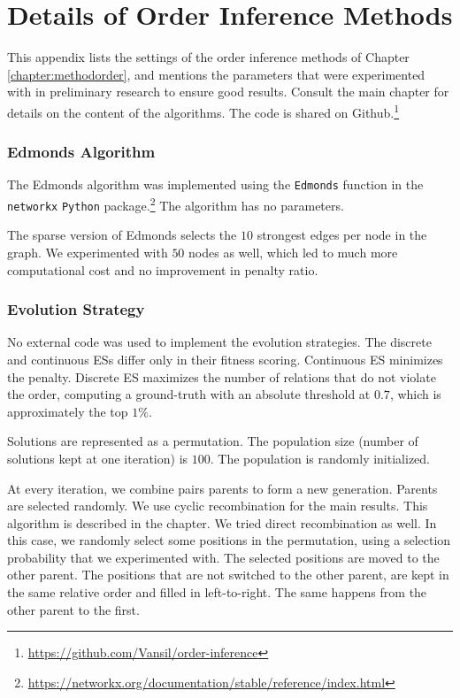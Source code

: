 \newpage
\section{Details of Order Inference Methods}
\label{appendix:order}

This appendix lists the settings of the order inference methods of Chapter \ref{chapter:methodorder}, and mentions the parameters that were experimented with in preliminary research to ensure good results. Consult the main chapter for details on the content of the algorithms. The code is shared on Github.\footnote{\href{https://github.com/Vansil/order-inference}{https://github.com/Vansil/order-inference}}

\subsubsection{Edmonds Algorithm}

The Edmonds algorithm was implemented using the \texttt{Edmonds} function in the \texttt{networkx} \texttt{Python} package.\footnote{\href{https://networkx.org/documentation/stable/reference/index.html}{https://networkx.org/documentation/stable/reference/index.html}} The algorithm has no parameters.

The sparse version of Edmonds selects the $10$ strongest edges per node in the graph. We experimented with $50$ nodes as well, which led to much more computational cost and no improvement in penalty ratio.


\subsubsection{Evolution Strategy}

No external code was used to implement the evolution strategies. The discrete and continuous ESs differ only in their fitness scoring. Continuous ES minimizes the penalty. Discrete ES maximizes the number of relations that do not violate the order, computing a ground-truth with an absolute threshold at $0.7$, which is approximately the top $1\%$.

Solutions are represented as a permutation. The population size (number of solutions kept at one iteration) is $100$. The population is randomly initialized. 

At every iteration, we combine pairs parents to form a new generation. Parents are selected randomly. We use cyclic recombination for the main results. This algorithm is described in the chapter. We tried direct recombination as well. In this case, we randomly select some positions in the permutation, using a selection probability that we experimented with. The selected positions are moved to the other parent. The positions that are not switched to the other parent, are kept in the same relative order and filled in left-to-right. The same happens from the other parent to the first.

